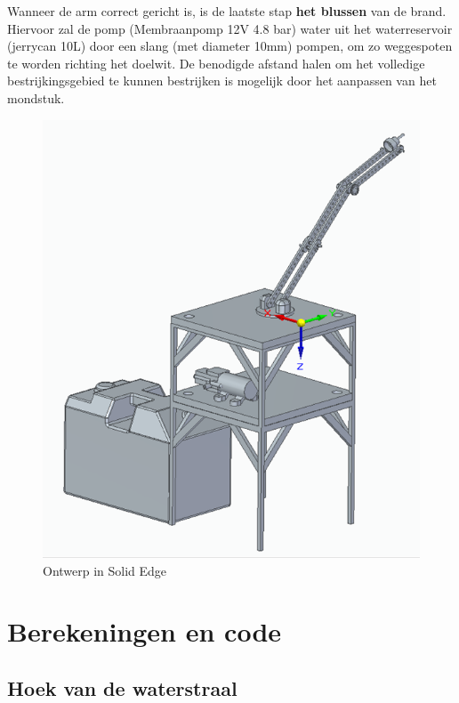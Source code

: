 \documentclass[kulak]{kulakarticle} %
\begin{document}
Wanneer de arm correct gericht is, is de laatste stap \textbf{het blussen} van de brand. Hiervoor zal de pomp (Membraanpomp 12V 4.8 bar) water uit het waterreservoir (jerrycan 10L) door een slang (met diameter 10mm) pompen, om zo weggespoten te worden richting het doelwit. De benodigde afstand halen om het volledige bestrijkingsgebied te kunnen bestrijken is mogelijk door het aanpassen van het mondstuk.\\

\begin{figure} [!h]
	\centering
	\includegraphics[width = .75 \textwidth]{Solid Edge Assembly foto}
	\caption{Ontwerp in Solid Edge}
	\label{ontwerp}
\end{figure}



\section{Berekeningen en code}
\subsection{Hoek van de waterstraal}
\end{document}

